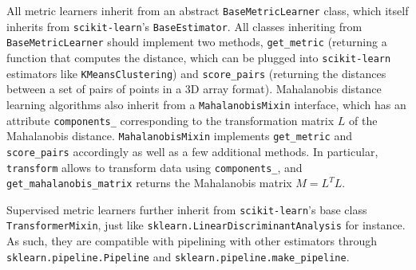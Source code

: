 \documentclass[twoside,11pt]{article}
\newcommand{\aurelien}[1]{\todo[inline,caption={},color=orange!40]{{\it Aurelien:~}#1}}
\begin{document}
All metric learners inherit from an abstract \texttt{BaseMetricLearner} class, which itself inherits from \texttt{scikit-learn}'s \texttt{BaseEstimator}. All classes inheriting from \texttt{BaseMetricLearner} should implement two methods, \texttt{get\_metric} (returning a function that computes the distance, which can be plugged into \texttt{scikit-learn} estimators like \texttt{KMeansClustering}) and \texttt{score\_pairs} (returning the distances between a set of pairs of points in a 3D array format).
Mahalanobis distance learning algorithms also inherit from a \texttt{MahalanobisMixin} interface, which has an attribute \texttt{components\_} corresponding to the transformation matrix $L$ of the Mahalanobis distance. \texttt{MahalanobisMixin} implements \texttt{get\_metric} and \texttt{score\_pairs} accordingly as well as a few additional methods. In particular, \texttt{transform} allows to transform data using \texttt{components\_}, and \texttt{get\_mahalanobis\_matrix} returns the Mahalanobis matrix $M=L^TL$.

Supervised metric learners further inherit from \texttt{scikit-learn}'s base class \texttt{TransformerMixin}, just like \texttt{sklearn.LinearDiscriminantAnalysis} for instance. As such, they are compatible with pipelining with other estimators through \texttt{sklearn.pipeline.Pipeline} and \texttt{sklearn.pipeline.make\_pipeline}.
\end{document}

